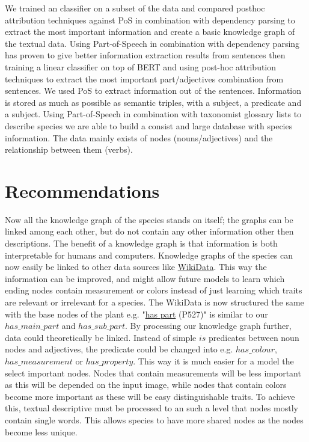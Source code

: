 \documentclass[a4paper, 12pt, oneside]{book} %
\begin{document}
We trained an classifier on a subset of the data and compared posthoc attribution techniques against PoS in combination with dependency parsing to extract the most important information and create a basic knowledge graph of the textual data.
Using Part-of-Speech in combination with dependency parsing has proven to give better information extraction results from sentences then training a linear classifier on top of BERT and using post-hoc attribution techniques to extract the most important part/adjectives combination from sentences.
We used PoS to extract information out of the sentences.
Information is stored as much as possible as semantic triples, with a subject, a predicate and a subject.
Using Part-of-Speech in combination with taxonomist glossary lists to describe species we are able to build a consist and large database with species information.
The data mainly exists of nodes (nouns/adjectives) and the relationship between them (verbs).


\newpage
\section{Recommendations}
 


Now all the knowledge graph of the species stands on itself; the graphs can be linked among each other, but do not contain any other information other then descriptions.
The benefit of a knowledge graph is that information is both interpretable for humans and computers.
Knowledge graphs of the species can now easily be linked to other data sources like \href{https://www.wikidata.org/wiki/Wikidata:Main_Page}{WikiData}.
This way the information can be improved, and might allow future models to learn which ending nodes contain measurement or colors instead of just learning which traits are relevant or irrelevant for a species.
The WikiData is now structured the same with the base nodes of the plant e.g. "\href{https://www.wikidata.org/wiki/Property:P527}{has part} (P527)"  is similar to our $has\_main\_part$ and $has\_sub\_part$.
By processing our knowledge graph further, data could theoretically be linked.
Instead of simple $is$ predicates between noun nodes and adjectives, the predicate could be changed into e.g. $has\_colour$, $has\_measurement$ or $has\_property$.
This way it is much easier for a model the select important nodes.
Nodes that contain measurements will be less important as this will be depended on the input image, while nodes that contain colors become more important as these will be easy distinguishable traits.
To achieve this, textual descriptive must be processed to an such a level that nodes mostly contain single words.
This allows species to have more shared nodes as the nodes become less unique.
\end{document}
